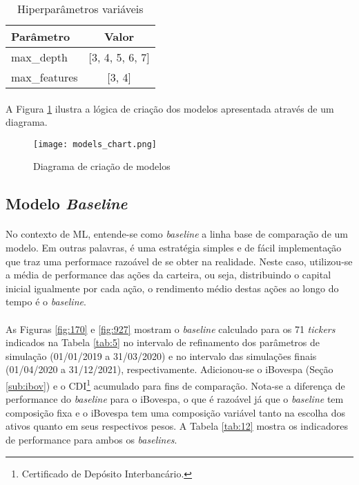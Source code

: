 \begin{table}[!htb]
    \begin{center}
        \begin{tabular}{ l|c }
            Parâmetro & Valor \\
            \hline
            max\_depth & [3, 4, 5, 6, 7] \\
            max\_features & [3, 4] \\
        \end{tabular}
        \caption{Hiperparâmetros variáveis}
        \label{tab:16}
    \end{center}
\end{table}

\paragraph{} A Figura \ref{fig:580} ilustra a lógica de criação dos modelos apresentada através de um diagrama.

\begin{figure}[!htb]
    \texttt{[image: models\_chart.png]}
    \centering
    \caption{Diagrama de criação de modelos}
    \label{fig:580}
\end{figure}




\FloatBarrier
\subsection{Modelo \textit{Baseline}}
\label{sub:baseline}

\paragraph{} No contexto de ML, entende-se como \textit{baseline} a linha base de comparação de um modelo. Em outras palavras, é uma estratégia simples e de fácil implementação que traz uma performace razoável de se obter na realidade. Neste caso, utilizou-se a média de performance das ações da carteira, ou seja, distribuindo o capital inicial igualmente por cada ação, o rendimento médio destas ações ao longo do tempo é o \textit{baseline}.

\paragraph{} As Figuras \ref{fig:170} e \ref{fig:927} mostram o \textit{baseline} calculado para os 71 \textit{tickers} indicados na Tabela \ref{tab:5} no intervalo de refinamento dos parâmetros de simulação (01/01/2019 a 31/03/2020) e no intervalo das simulações finais (01/04/2020 a 31/12/2021), respectivamente. Adicionou-se o iBovespa (Seção \ref{sub:ibov}) e o CDI\footnote{Certificado de Depósito Interbancário.} acumulado para fins de comparação. Nota-se a diferença de performance do \textit{baseline} para o iBovespa, o que é razoável já que o \textit{baseline} tem composição fixa e o iBovespa tem uma composição variável tanto na escolha dos ativos quanto em seus respectivos pesos. A Tabela \ref{tab:12} mostra os indicadores de performance para ambos os \textit{baselines}.

